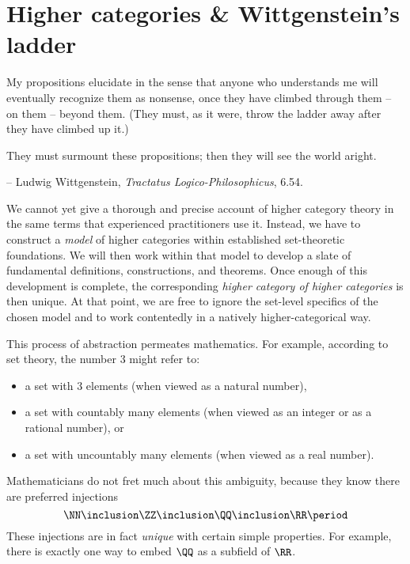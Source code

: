 
\chapter*{Higher categories \& Wittgenstein's ladder}%
\label{cha:introduction}

\epigraph{
  My propositions elucidate in the sense that anyone who understands me will eventually recognize them as nonsense, once they have climbed through them -- on them -- beyond them.
  (They must, as it were, throw the ladder away after they have climbed up it.)

  They must surmount these propositions;
  then they will see the world aright.
}{-- Ludwig Wittgenstein, \textit{Tractatus Logico-Philosophicus}, 6.54.}

We cannot yet give a thorough and precise account of higher category theory in the same terms that experienced practitioners use it.
Instead, we have to construct a \emph{model} of higher categories within established set-theoretic foundations.
We will then work within that model to develop a slate of fundamental definitions, constructions, and theorems.
Once enough of this development is complete,
the corresponding \emph{higher category of higher categories} is then unique.
At that point, we are free to ignore the set-level specifics of the chosen model and to work contentedly in a natively higher-categorical way.

This process of abstraction permeates mathematics.
For example, according to set theory, the number $3$ might refer to:
\begin{itemize}
  \item a set with $3$ elements (when viewed as a natural number),
  \item a set with countably many elements (when viewed as an integer or as a rational number), or
  \item a set with uncountably many elements (when viewed as a real number).
\end{itemize}
Mathematicians do not fret much about this ambiguity, because they know there are preferred injections
\[
  \NN \inclusion \ZZ \inclusion \QQ \inclusion \RR \period
\]
These injections are in fact \emph{unique} with certain simple properties.
For example, there is exactly one way to embed $\QQ$ as a subfield of $\RR$.

